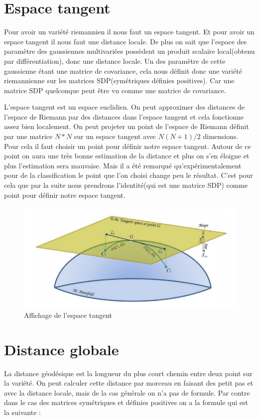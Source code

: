 \documentclass{article}[12pt]
\begin{document}
\section{Espace tangent}
Pour avoir un variété riemannien il nous faut un espace tangent. Et pour avoir un espace tangent il nous faut une distance locale. De plus on sait que l'espace des paramètre des gaussiennes multivariées possèdent un produit scalaire local(obtenu par différentiation), donc une distance locale. Un des paramètre de cette gaussienne étant une matrice de covariance, cela nous définit donc une variété riemannienne sur les matrices SDP(symétriques définies positives). Car une matrice SDP quelconque  peut être vu comme une matrice de covariance.

L'espace tangent est un espace euclidien. On peut approximer des distances de l'espace de Riemann par des distances dans l'espace tangent et cela fonctionne assez bien localement. On peut projeter un point de l'espace de Riemann définit par une matrice $N*N$ sur un espace tangent avec $N(N+1)/2$ dimensions. Pour cela il faut choisir un point pour définir notre espace tangent. Autour de ce point on aura une très bonne estimation de la distance et plus on s'en éloigne et plus l'estimation sera mauvaise. Mais il a été remarqué qu’expérimentalement pour de la classification le point que l'on choisi change peu le résultat. C'est pour cela que par la suite nous prendrons l'identité(qui est une matrice SDP) comme point pour définir notre espace tangent.

\begin{figure}[H]
\begin{center}
\includegraphics[scale=0.5]{images/Riemann_tangent_space.png}
\end{center}
\caption{Affichage de l'espace tangent}
\end{figure}


\section{Distance globale}
La distance géodésique est la longueur du plus court chemin entre deux point sur la variété. On peut calculer cette distance par morceau en faisant des petit pas et avec la distance locale, mais de la cas générale on n'a pas de formule. Par contre dans le cas des matrices symétriques et définies positives on a la formule qui est la suivante \cite{moakher_differential_2005} :
\end{document}
